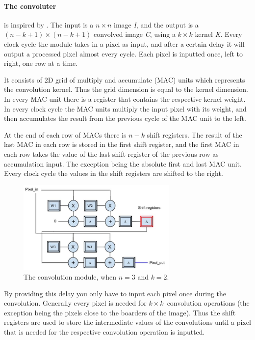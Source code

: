 \paragraph{The convoluter} is inspired by \cite{Farabet2009}. The input is a $ n \times n $ image \textit{I}, and the output is a $ (n-k+1) \times (n-k+1) $ convolved image \textit{C}, using a $ k \times k $ kernel \textit{K}. Every clock cycle the module takes in a pixel as input, and after a certain delay it will output a processed pixel almost every cycle. Each pixel is inputted once, left to right, one row at a time. 

It consists of 2D grid of multiply and accumulate (MAC) units which represents the convolution kernel. Thus the grid dimension is equal to the kernel dimension. In every MAC unit there is a register that contains the respective kernel weight. In every clock cycle the MAC units multiply the input pixel with its weight, and then accumulates the result from the previous cycle of the MAC unit to the left. 

At the end of each row of MACs there is $ n - k $ shift registers. The result of the last MAC in each row is stored in the first shift register, and the first MAC in each row takes the value of the last shift register of the previous row as accumulation input. The exception being the absolute first and last MAC unit. Every clock cycle the values in the shift registers are shifted to the right. 

\begin{figure}[h!]
  \centering
      \includegraphics[width=0.7\textwidth]{Figures/Method/Convolver}
  \caption{The convolution module, when $ n = 3 $ and $ k = 2 $.}
\end{figure}
	
By providing this delay you only have to input each pixel once during the convolution. Generally every pixel is needed for $ k \times k $ convolution operations (the exception being the pixels close to the boarders of the image). Thus the shift registers are used to store the intermediate values of the convolutions until a pixel that is needed for the respective convolution operation is inputted. 


